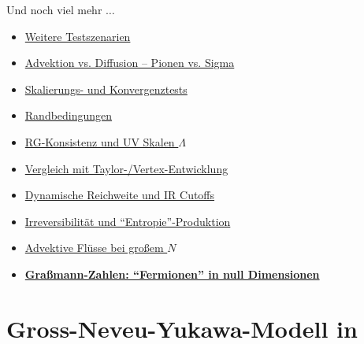 \documentclass[10pt]{beamer}
\begin{document}
\begin{frame}{Und noch viel mehr $\ldots$}
	\hypersetup{linkcolor=goetheBlauDarker} 
	\begin{itemize}
		\item \hyperlink{0dScII}{Weitere Testszenarien}
		\item \hyperlink{0dadvection}{Advektion vs. Diffusion -- Pionen vs. Sigma}
		\item \hyperlink{0dscaling}{Skalierungs- und Konvergenztests}
		\item \hyperlink{0dxmax}{Randbedingungen}
		\item \hyperlink{0dLambda}{RG-Konsistenz und UV Skalen $\Lambda$}
		\item \hyperlink{0dTaylor}{Vergleich mit Taylor-/Vertex-Entwicklung}
		\item \hyperlink{0dkrange}{Dynamische Reichweite und IR Cutoffs}
		\item \hyperlink{0dentropie}{Irreversibilität und ``Entropie''-Produktion}
		\item \hyperlink{0dlargeN}{Advektive Flüsse bei großem $N$}
		\item \hyperlink{0dfermion}{\textbf{Graßmann-Zahlen: ``Fermionen'' in null Dimensionen}}
	\end{itemize}

\end{frame}

\section[GNY-Modell in \dimcomplus{1}{1}]{Gross-Neveu-Yukawa-Modell in }
\end{document}

